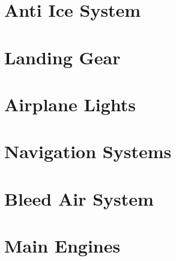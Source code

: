\section{Anti Ice System}
\section{Landing Gear}
\section{Airplane Lights}
\section{Navigation Systems}
\section{Bleed Air System}
\section{Main Engines}